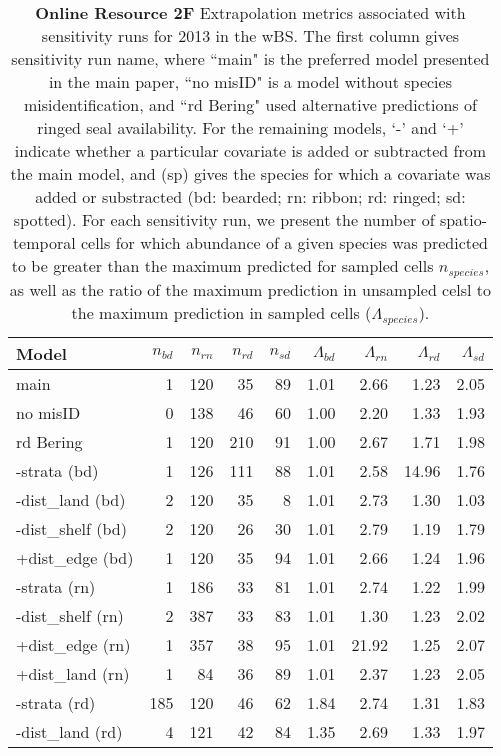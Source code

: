 \documentclass{svjour3}
\begin{document}
\begin{table}[htbp]
\centering
\caption{\textbf{Online Resource 2F} Extrapolation metrics associated with sensitivity runs for 2013 in the wBS. The first column gives sensitivity run name, where ``main" is the preferred model presented in the main paper, ``no misID" is a model without species misidentification, and ``rd Bering" used alternative predictions of ringed seal availability.  For the remaining models, `-' and `+' indicate whether a particular covariate is added or subtracted from the main model, and (sp) gives the species for which a covariate was added or substracted (bd: bearded; rn: ribbon; rd: ringed; sd: spotted).  For each sensitivity run, we present the number of spatio-temporal cells for which abundance of a given species was predicted to be greater than the maximum predicted for sampled cells $n_{species}$, as well as the ratio of the maximum prediction in unsampled celsl to the maximum prediction in sampled cells ($\Lambda_{species}$). }
\begin{tabular}{lrrrrrrrr}
  \hline
Model & $n_{bd}$ & $n_{rn}$ & $n_{rd}$ & $n_{sd}$ & $\Lambda_{bd}$ & $\Lambda_{rn}$ & $\Lambda_{rd}$ & $\Lambda_{sd}$ \\  \hline
main & 1 & 120 & 35 & 89 & 1.01 & 2.66 & 1.23 & 2.05 \\
  no misID & 0 & 138 & 46 & 60 & 1.00 & 2.20 & 1.33 & 1.93 \\
  rd Bering & 1 & 120 & 210 & 91 & 1.00 & 2.67 & 1.71 & 1.98 \\
  -strata (bd) & 1 & 126 & 111 & 88 & 1.01 & 2.58 & 14.96 & 1.76 \\
  -dist\_land (bd) & 2 & 120 & 35 & 8 & 1.01 & 2.73 & 1.30 & 1.03 \\
  -dist\_shelf (bd) & 2 & 120 & 26 & 30 & 1.01 & 2.79 & 1.19 & 1.79 \\
  +dist\_edge (bd) & 1 & 120 & 35 & 94 & 1.01 & 2.66 & 1.24 & 1.96 \\
  -strata (rn) & 1 & 186 & 33 & 81 & 1.01 & 2.74 & 1.22 & 1.99 \\
  -dist\_shelf (rn) & 2 & 387 & 33 & 83 & 1.01 & 1.30 & 1.23 & 2.02 \\
  +dist\_edge (rn) & 1 & 357 & 38 & 95 & 1.01 & 21.92 & 1.25 & 2.07 \\
  +dist\_land (rn) & 1 & 84 & 36 & 89 & 1.01 & 2.37 & 1.23 & 2.05 \\
  -strata (rd) & 185 & 120 & 46 & 62 & 1.84 & 2.74 & 1.31 & 1.83 \\
  -dist\_land (rd) & 4 & 121 & 42 & 84 & 1.35 & 2.69 & 1.33 & 1.97 \\

\end{tabular}
\end{table}
\end{document}
